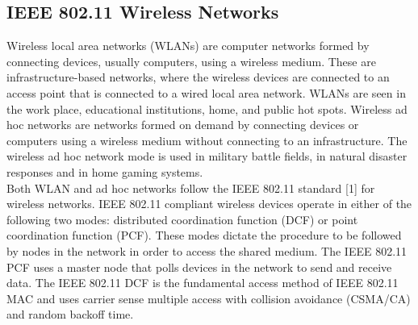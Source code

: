 \documentclass[12pt,letterpaper,english]{article}
\begin{document}
\subsection{IEEE 802.11 Wireless Networks}
\indent Wireless local area networks (WLANs) are computer networks formed by connecting devices, usually computers, using a wireless medium. 
These are infrastructure-based networks, where the wireless devices are connected to an access point that is connected to a wired local area network. 
WLANs are seen in the work place, educational institutions, home, and public hot spots.
Wireless ad hoc networks are networks formed on demand by connecting devices or computers using a wireless medium without connecting to an infrastructure. The wireless ad hoc network mode is used in military battle fields, in natural disaster responses and in home gaming systems.
\\
\indent Both WLAN and ad hoc networks follow the IEEE 802.11 standard 
[1] 
for wireless networks. 
IEEE 802.11 compliant wireless devices operate in either of the following two modes: distributed coordination function (DCF) or point coordination function (PCF). 
These modes dictate the procedure to be followed by nodes in the network in order to access the shared medium.
The IEEE 802.11 PCF uses a master node that polls devices in the network to send and receive data.
The IEEE 802.11 DCF is the fundamental access method of IEEE 802.11 MAC and uses carrier sense multiple access with collision avoidance (CSMA/CA) and random backoff time. 
\end{document}
